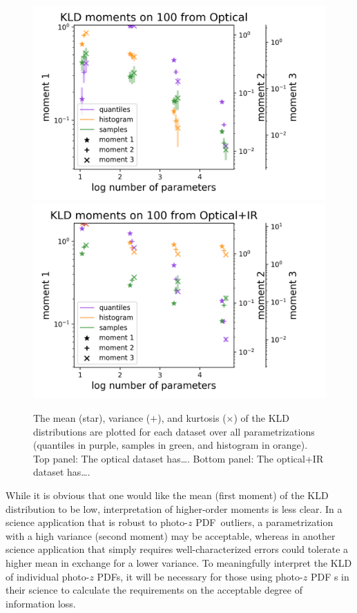 \documentclass[\docopts]{\docclass}
\newcommand{\pz}{photo-$z$ PDF}
\begin{document}
\begin{figure}
  \includegraphics[width=0.9\columnwidth]{lsst_moments.png}\\
  \includegraphics[width=0.9\columnwidth]{euclid_moments.png}
  \caption{The mean (star), variance ($+$), and kurtosis ($\times$) of the KLD 
distributions are plotted for each dataset over all parametrizations (quantiles 
in purple, samples in green, and histogram in orange).  Top panel: The optical 
dataset has\dots.  Bottom panel: The optical+IR dataset has\dots.
  \label{fig:moments}}
\end{figure}

While it is obvious that one would like the mean (first moment) of the KLD 
distribution to be low, interpretation of higher-order moments is less clear.  
In a science application that is robust to \pz\ outliers, a parametrization 
with a high variance (second moment) may be acceptable, whereas in another 
science application that simply requires well-characterized errors could 
tolerate a higher mean in exchange for a lower variance.  To meaningfully 
interpret the KLD of individual \pz s, it will be necessary for those using \pz 
s in their science to calculate the requirements on the acceptable degree of 
information loss.
\end{document}
